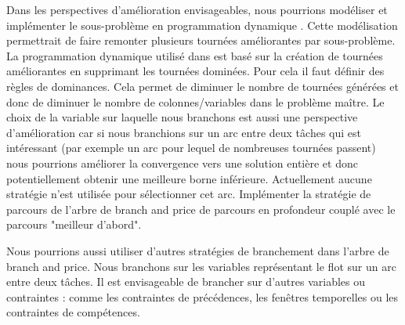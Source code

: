 Dans les perspectives d'amélioration envisageables, nous pourrions modéliser et implémenter le sous-problème en programmation dynamique \cite{hernandez2014new}.
Cette modélisation permettrait de faire remonter plusieurs tournées améliorantes par sous-problème.
La programmation dynamique utilisé dans \cite{hernandez2014new} est basé sur la création de tournées améliorantes en supprimant les tournées dominées.
Pour cela il faut définir des règles de dominances.
Cela permet de diminuer le nombre de tournées générées et donc de diminuer le nombre de colonnes/variables dans le problème maître.
Le choix de la variable sur laquelle nous branchons est aussi une perspective d'amélioration car si nous branchions sur un arc entre deux tâches qui est intéressant (par exemple un arc pour lequel de nombreuses tournées passent) nous pourrions améliorer la convergence vers une solution entière et donc potentiellement obtenir une meilleure borne inférieure.
Actuellement aucune stratégie n'est utilisée pour sélectionner cet arc.
Implémenter la stratégie de parcours de l'arbre de branch and price de parcours en profondeur couplé avec le parcours "meilleur d'abord".

Nous pourrions aussi utiliser d'autres stratégies de branchement dans l'arbre de branch and price.
Nous branchons sur les variables représentant le flot sur un arc entre deux tâches.
Il est envisageable de brancher sur d'autres variables ou contraintes : comme les contraintes de précédences, les fenêtres temporelles ou les contraintes de compétences.


